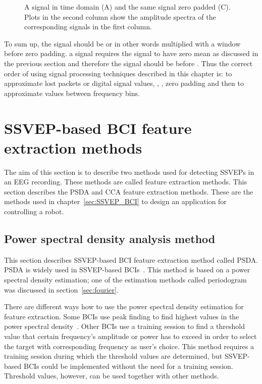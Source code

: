 \begin{figure}[h!]
	
	\caption{A signal in time domain (A) and the same signal zero padded (C). Plots in the second column show the amplitude spectra of the corresponding signals in the first column.}
	\label{fig:zero_padding}
\end{figure}

To sum up, the signal should be  or in other words multiplied with a \gls{window} before \gls{zero padding}.  a signal requires the signal to have zero \gls{mean} as discussed in the previous section and therefore the signal should be  before . Thus the correct order of using signal processing techniques described in this chapter is:  to approximate lost packets or \gls{digital signal} values, , , \gls{zero padding} and then  to approximate values between \glspl{frequency bin}.

\section{SSVEP-based BCI feature extraction methods}
\label{sec:SSVEP_detection}
The aim of this section is to describe two methods used for detecting \glspl{SSVEP} in an \gls{EEG} recording. These methods are called \gls{feature extraction} methods. This section describes the \gls{PSDA} and \gls{CCA} \gls{feature extraction} methods. These are the methods used in chapter~\ref{sec:SSVEP_BCI} to design an application for controlling a robot. %

\subsection{Power spectral density analysis method}

This section describes \gls{SSVEP}-based \gls{BCI} \gls{feature extraction} method called \gls{PSDA}. \Gls{PSDA} is widely used in \gls{SSVEP}-based \glspl{BCI}~\cite{bin2009cca}. This method is based on a \gls{power spectral density} estimation; one of the estimation methods called \gls{periodogram} was discussed in section~\ref{sec:fourier}.

There are different ways how to use the \gls{power spectral density} estimation for \gls{feature extraction}. Some \glspl{BCI} use peak finding to find highest values in the \gls{power spectral density}~\cite{cca_lin}. Other \glspl{BCI} use a training session to find a threshold value that certain frequency's amplitude or power has to exceed in order to select the \gls{target} with corresponding frequency as user's choice. This method requires a training session during which the threshold values are determined, but \gls{SSVEP}-based \glspl{BCI} could be implemented without the need for a training session. Threshold values, however, can be used together with other methods. 

